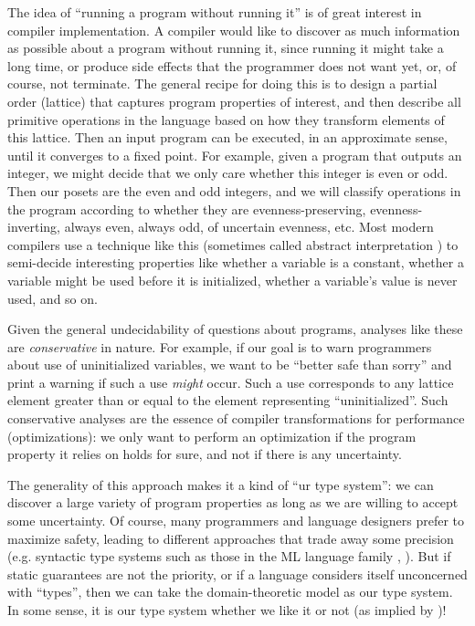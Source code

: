 The idea of ``running a program without running it'' is of great interest
in compiler implementation. A compiler would like to discover as much
information as possible about a program without running it, since
running it might take a long time, or produce side effects that the
programmer does not want yet, or, of course, not terminate.
The general recipe for doing this is to design a partial order (lattice)
that captures program properties of interest, and then describe all
primitive operations in the language based on how they transform
elements of this lattice.
Then an input program can be executed, in an approximate sense, until
it converges to a fixed point.
For example, given a program that outputs an integer, we might decide
that we only care whether this integer is even or odd. Then our posets
are the even and odd integers, and we will classify operations in the
program according to whether they are evenness-preserving,
evenness-inverting, always even, always odd, of uncertain evenness,
etc. %
Most modern compilers use a technique like this
(sometimes called abstract interpretation \cite{abstractinterp})
to semi-decide
interesting properties like whether a variable is a constant, whether
a variable might be used before it is initialized, whether a variable's
value is never used, and so on.

Given the general undecidability of questions about programs, analyses
like these are \emph{conservative} in nature.
For example, if our goal is to warn programmers about use of uninitialized
variables, we want to be ``better safe than sorry'' and print a warning
if such a use \emph{might} occur.
Such a use corresponds to any lattice element greater than or equal to
the element representing ``uninitialized''.
Such conservative analyses are the essence of compiler transformations
for performance (optimizations): we only want to perform an optimization
if the program property it relies on holds for sure, and not if there is
any uncertainty.

The generality of this approach makes it a kind of ``ur type system'':
we can discover a large variety of program properties as long as we are
willing to accept some uncertainty.
Of course, many programmers and language designers prefer to maximize
safety, leading to different approaches that trade away some precision
(e.g. syntactic type systems such as those in the ML language
family \cite{hindley1969principal}, \cite{MLtypeinf}).
But if static guarantees are not the priority, or if a language considers
itself unconcerned with ``types'', then we can take the domain-theoretic
model as our type system.
In some sense, it is our type system whether we like it or not
(as implied by \cite{scott1976data})!

